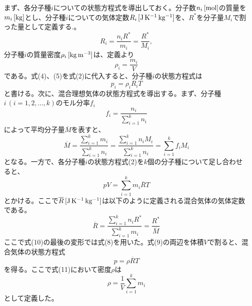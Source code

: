 \documentclass{jsarticle}
\begin{document}
まず、各分子種$i$についての状態方程式を導出しておく。分子数$n_{i}\,[\rm{mol}]$の質量を$m_{i}\,[\rm{kg}]$とし、分子種$i$についての気体定数$R_{i}\,[\rm{J\,K^{-1}\,kg^{-1}}]$を、$R^{*}$を分子量$M_{i}$で割った量として定義する.。
\begin{equation}
 R_{i}=\frac{n_{i}R^{*}}{m_{i}}=\frac{R^{*}}{M_{i}},
\end{equation}
分子種$i$の質量密度$\rho_{i}\,\rm{[kg\,m^{-3}]}$は、定義より
\begin{equation}
 \rho_{i}=\frac{m_{i}}{V}
\end{equation}
である。式(4)、(5)を式(2)に代入すると、分子種$i$の状態方程式は
\begin{equation}
 p_{i}=\rho_{i}R_{i}T 
\end{equation}
と書ける。次に、混合理想気体の状態方程式を導出する。まず、分子種$i\,(i = 1,2,\dots, k)$のモル分率$f_{i}$
\begin{equation}
 f_{i}=\frac{n_{i}}{\sum_{i=1}^{k}n_{i}} 
\end{equation}
によって平均分子量$\overline{M}$を表すと、
\begin{equation}
 \overline{M}=\frac{\sum_{i=1}^{k}m_{i}}{\sum_{i=1}^{k}n_{i}}=\frac{\sum_{i=1}^{k}n_{i}M_{i}}{\sum_{i=1}^{k}n_{i}}=\sum_{i=1}^{k}f_{i}M_{i}
\end{equation}
となる。一方で、各分子種$i$の状態方程式(2)を$k$個の分子種について足し合わせると、
\begin{equation}
 pV=\sum_{i=1}^{k}m_{i}\overline{R}T 
\end{equation}
とかける。ここで$\overline{R}\,[\rm{J\,K^{-1}\,kg^{-1}}]$は以下のように定義される混合気体の気体定数である。
\begin{equation}
 \overline{R}=\frac{\sum_{i=1}^{k}n_{i}R^{*}}{\sum_{i=1}^{k}m_{i}}=\frac{R^{*}}{\overline{M}}
\end{equation}
ここで式(10)の最後の変形では式(8)を用いた。式(9)の両辺を体積$V$で割ると、混合気体の状態方程式
\begin{equation}
 p=\rho\overline{R}T 
\end{equation}
を得る。ここで式(11)において密度$\rho$は
\begin{equation}
 \rho=\frac{1}{V}\sum_{i=1}^{k}m_{i} 
\end{equation}
として定義した。
\end{document}
